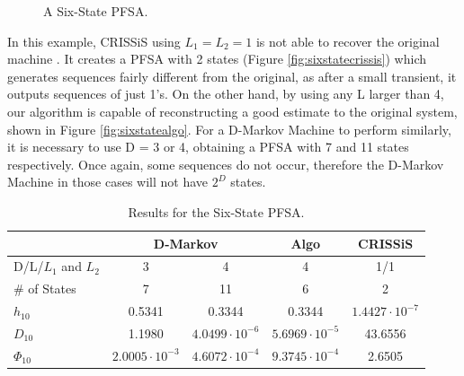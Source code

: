 {\begin{figure}
\centering
{}
\caption{A Six-State PFSA.\label{fig:sixstate}}
\end{figure}

In this example, CRISSiS using $L_1 = L_2 = 1$ is not able to recover the original machine . It creates a PFSA with 2 states (Figure \ref{fig:sixstatecrissis}) which generates sequences fairly different from the original, as after a small transient, it outputs sequences of just 1's. On the other hand, by using any L larger than 4, our algorithm is capable of reconstructing a good estimate to the original system, shown in Figure \ref{fig:sixstatealgo}. For a D-Markov Machine to perform similarly, it is necessary to use D = 3 or 4, obtaining a PFSA with 7 and 11 states respectively. Once again, some sequences do not occur, therefore the D-Markov Machine in those cases will not have $2^D$ states.

\begin{table}
\centering
\begin{tabular}{|l|c|c|c|c|}
\hline
 & \multicolumn{2}{c|}{\textbf{D-Markov}} & \textbf{Algo} & \textbf{CRISSiS}\\
 \hline
D/L/$L_1$ and $L_2$ & 3 & 4 & 4 & 1/1\\
\hline
\# of States & 7 & 11 & 6 & 2 \\ 
$h_{10}$ & 0.5341 & 0.3344 & 0.3344 & $1.4427\cdot 10^{-7}$ \\
$D_{10}$ & 1.1980 & $4.0499\cdot 10^{-6}$ & $5.6969\cdot10^{-5}$ &  43.6556\\
$\Phi_{10}$ & $2.0005\cdot 10^{-3}$ & $4.6072\cdot 10^{-4}$ & $9.3745\cdot10^{-4}$ & 2.6505\\
 \hline
\end{tabular}
\caption{Results for the Six-State PFSA. \label{tab:sixstate}}
\end{table}

}
